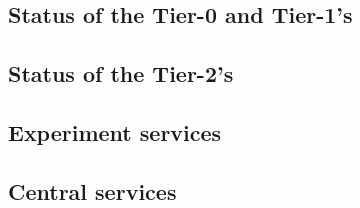 \subsection {Status of the Tier-0 and Tier-1's}
\label{ssec-t1trans}


\subsection {Status of the Tier-2's}
\label{ssec-t2trans}


\subsection {Experiment services}
\label{ssec-exps}


\subsection {Central services}
\label{ssec-cserv}


